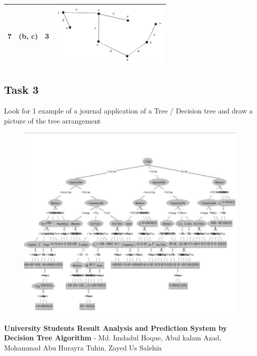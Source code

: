 \documentclass[12pt,titlepage]{article}
\begin{document}
\begin{table}[h]
\begin{tabularx}{\textwidth}{|c|c|c|X|}
        \hline
        7 & (b, c) & 3 & \includegraphics[height=3cm]{./images/tree-c-b.png} \\
        \hline
    \end{tabularx}
\end{table}

\pagebreak

\subsection*{Task 3}
Look for 1 example of a journal application of a Tree / Decision tree and draw a picture of the tree arrangement

\begin{figure}[h]
    \centering
    \includegraphics[width=\textwidth]{./images/tree-journal.png}
\end{figure}

\textbf{University Students Result Analysis and Prediction System by Decision Tree Algorithm}
- Md. Imdadul Hoque, Abul kalam Azad, Mohammad Abu Hurayra Tuhin, Zayed Us Salehin
\end{document}

